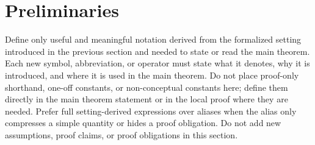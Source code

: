\section{Preliminaries}

Define only useful and meaningful notation derived from the formalized setting
introduced in the previous section and needed to state or read the main theorem.
Each new symbol, abbreviation, or operator must state what it denotes, why it is
introduced, and where it is used in the main theorem. Do not place proof-only
shorthand, one-off constants, or non-conceptual constants here; define them
directly in the main theorem statement or in the local proof where they are
needed. Prefer full setting-derived expressions over aliases when the alias only
compresses a simple quantity or hides a proof obligation. Do not add new
assumptions, proof claims, or proof obligations in this section.
